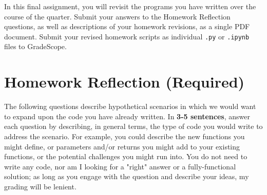 \documentclass{homework}
\begin{document}
\maketitle

In this final assignment, you will revisit the programs you have written over the course of the quarter. Submit your answers to the Homework Reflection questions, as well as descriptions of your homework revisions, as a single PDF document. Submit your revised homework scripts as individual \texttt{.py} or \texttt{.ipynb} files to GradeScope.

\section*{Homework Reflection (Required)}



The following questions describe hypothetical scenarios in which we would want to expand upon the code you have already written. In \textbf{3-5 sentences}, answer each question by describing, in general terms, the type of code you would write to address the scenario. For example, you could describe the new functions you might define, or parameters and/or returns you might add to your existing functions, or the potential challenges you might run into. You do not need to write any code, nor am I looking for a "right" answer or a fully-functional solution; as long as you engage with the question and describe your ideas, my grading will be lenient.
\end{document}
